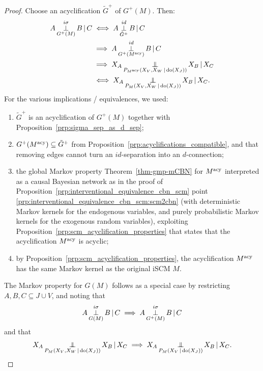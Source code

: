 \begin{proof}
  Choose an acyclification $\tilde{G}^+$ of $G^+(M)$. Then:
  \begin{equation*}\begin{split}
    A \operatorname*{\perp}^{i\sigma}_{G^+(M)} B \operatorname*{|} C 
    & \iff A \operatorname*{\perp}^{id}_{\tilde{G}^+} B \operatorname*{|} C \\
    & \implies A \operatorname*{\perp}^{id}_{G^+(M^{\mathrm{acy}})} B \operatorname*{|} C \\
    & \implies X_A \operatorname*{\perp\mkern-11mu\perp}_{P_{M^{\mathrm{acy}}}(X_V,X_W \operatorname*{|} \operatorname{do}(X_{J}))} X_B \operatorname*{|} X_C \\
    & \iff X_A \operatorname*{\perp\mkern-11mu\perp}_{P_{M}(X_V,X_W \operatorname*{|} \operatorname{do}(X_{J}))} X_B \operatorname*{|} X_C.
  \end{split}\end{equation*}
  For the various implications / equivalences, we used:
  \begin{enumerate}
    \item $\tilde{G}^+$ is an acyclification of $G^+(M)$ together with Proposition~\ref{prp:sigma_sep_as_d_sep}; 
    \item $G^+(M^{\mathrm{acy}}) \subseteq \tilde{G}^+$ from Proposition~\ref{prp:acyclifications_compatible}, and that removing edges cannot turn an $id$-separation into an $d$-connection; 
    \item the global Markov property Theorem~\ref{thm-gmp-mCBN} for $M^{\mathrm{acy}}$ interpreted as a causal Bayesian network as in the proof of Proposition~\ref{prp:interventional_equivalence_cbn_scm} point \ref{prp:interventional_equivalence_cbn_scm:scm2cbn} (with deterministic Markov kernels for the endogenous variables, and purely probabilistic Markov kernels for the exogenous random variables), exploiting Proposition~\ref{prp:scm_acyclification_properties} that states that the acyclification $M^{\mathrm{acy}}$ is acyclic;
    \item by Proposition~\ref{prp:scm_acyclification_properties}, the acyclification $M^{\mathrm{acy}}$ has the same Markov kernel as the original iSCM $M$.
  \end{enumerate}
  The Markov property for $G(M)$ follows as a special case by restricting $A,B,C \subseteq J \cup V$, and noting that
  $$  A \operatorname*{\perp}^{i\sigma}_{G(M)} B \operatorname*{|} C  \implies A \operatorname*{\perp}^{i\sigma}_{G^+(M)} B \operatorname*{|} C$$
  and that
  $$X_A \operatorname*{\perp\mkern-11mu\perp}_{P_{M}(X_V,X_W \operatorname*{|} \operatorname{do}(X_{J}))} X_B \operatorname*{|} X_C \implies X_A \operatorname*{\perp\mkern-11mu\perp}_{P_{M}(X_V \operatorname*{|} \operatorname{do}(X_{J}))} X_B \operatorname*{|} X_C.$$
\end{proof}

